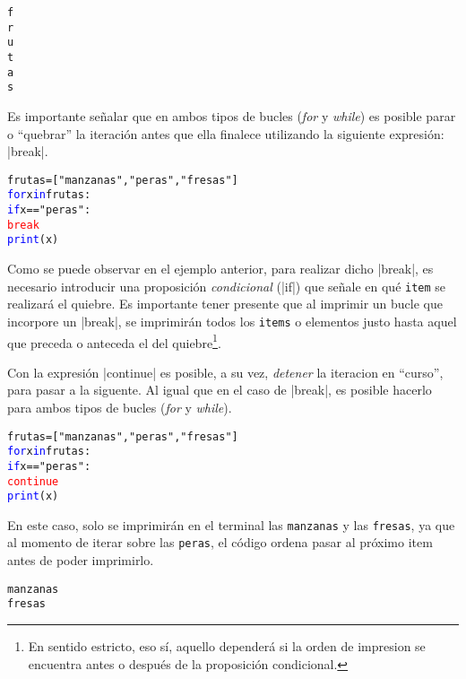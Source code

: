 \documentclass{article}
\begin{document}
\begin{enumerate}
\begin{itemize}
\begin{tcolorbox}
\begin{alltt}
f
r
u
t
a
s
\end{alltt}        
\end{tcolorbox}
\vspace{0.25cm}
\end{itemize}
\par \hspace{5pt} Es importante señalar que en ambos tipos de bucles (\emph{for} y \emph{while}) es posible parar o ``quebrar'' la iteración antes que ella finalece utilizando la siguiente expresión: \rverb|break|.
\begin{tcolorbox}
\begin{alltt}
frutas = ["manzanas", "peras", "fresas"]
\textcolor{blue}{for} x \textcolor{blue}{in} frutas:
  \textcolor{blue}{if} x == "peras":
    \textcolor{red}{break}
  \textcolor{blue}{print}(x) 
\end{alltt}        
\end{tcolorbox}
\par \hspace{5pt} Como se puede observar en el ejemplo anterior, para realizar dicho \rverb|break|, es necesario introducir una proposición \emph{condicional} (\bverb|if|) que señale en qué \verb|item| se realizará el quiebre. Es importante tener presente que al imprimir un bucle que incorpore un \rverb|break|, se imprimirán todos los \verb|items| o elementos justo hasta aquel que preceda o anteceda el del quiebre\footnote{
En sentido estricto, eso sí, aquello dependerá si la orden de impresion se encuentra antes o después de la proposición condicional.}.
\par \hspace{5pt} Con la expresión \rverb|continue| es posible, a su vez, \emph{detener} la iteracion en ``curso'', para pasar a la siguente. Al igual que en el caso de \rverb|break|, es posible hacerlo para ambos tipos de bucles (\emph{for} y \emph{while}).
\begin{tcolorbox}
\begin{alltt}
frutas = ["manzanas", "peras", "fresas"]
\textcolor{blue}{for} x \textcolor{blue}{in} frutas:
  \textcolor{blue}{if} x == "peras":
    \textcolor{red}{continue}
  \textcolor{blue}{print}(x) 
\end{alltt}        
\end{tcolorbox}
\par \hspace{5pt} En este caso, solo se imprimirán en el terminal las \verb|manzanas| y las \verb|fresas|, ya que al momento de iterar sobre las \verb|peras|, el código ordena pasar al próximo item antes de poder imprimirlo. 
\begin{tcolorbox}
\begin{alltt}
manzanas
fresas 
\end{alltt}        
\end{tcolorbox}
\vspace{0.5cm}


\end{enumerate}
\end{document}
